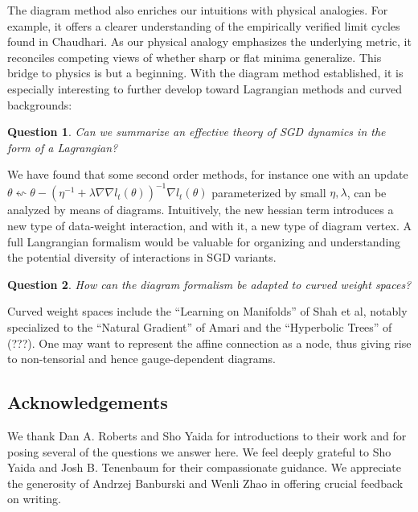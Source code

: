 \documentclass{article}
\newtheorem{quest}{Question}
\begin{document}

    The diagram method also enriches our intuitions with physical analogies.
    For example, it offers a clearer understanding of the empirically verified
    limit cycles found in Chaudhari.  As our physical analogy emphasizes the
    underlying metric, it reconciles competing views of whether sharp or flat
    minima generalize.  This bridge to physics is but a beginning.  With the
    diagram method established, it is especially interesting to further develop
    toward Lagrangian methods and curved backgrounds: 
    \begin{quest}
        Can we summarize an effective theory of SGD dynamics in the form of a 
        Lagrangian?  
    \end{quest}
        We have found that some second order methods, for instance one with 
        an update
        $
            \theta \leftsquigarrow
            \theta -
            (\eta^{-1} + \lambda \nabla \nabla l_t(\theta))^{-1} \nabla l_t(\theta)
        $
        parameterized by small $\eta, \lambda$, can be analyzed by means of
        diagrams.  Intuitively, the new hessian term introduces a new type of
        data-weight interaction, and with it, a new type of diagram vertex.  A
        full Langrangian formalism would be valuable for organizing and
        understanding the potential diversity of interactions in SGD variants. 
    \begin{quest}
        How can the diagram formalism be adapted to curved weight spaces?
    \end{quest}
        Curved weight spaces include the ``Learning on Manifolds'' of Shah et
        al, notably specialized to the  
        ``Natural Gradient'' of Amari and the ``Hyperbolic Trees'' of (???).
        One may want to represent the affine connection as a node, thus giving
        rise to non-tensorial and hence gauge-dependent diagrams.


\subsection{Acknowledgements}
    We thank Dan A. Roberts and Sho Yaida for introductions to their work and
    for posing several of the questions we answer here.  We feel deeply
    grateful to Sho Yaida and Josh B. Tenenbaum for their compassionate
    guidance.  We appreciate the generosity of
        Andrzej Banburski
        and
        Wenli Zhao
    in offering crucial feedback on writing.
\end{document}

